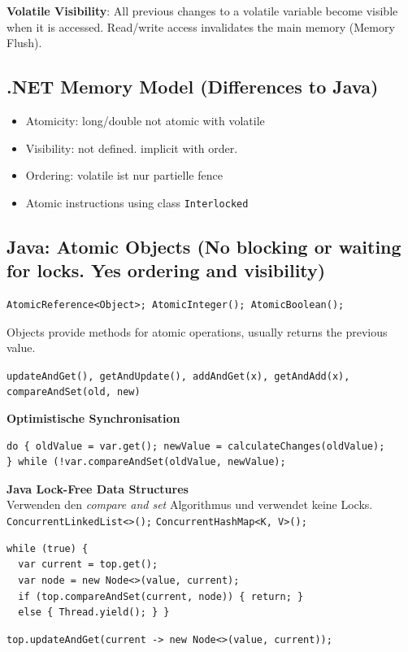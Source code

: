 \textbf{Volatile Visibility}: All previous changes to a volatile variable become visible when it is accessed. Read/write access invalidates the main memory (Memory Flush).

\subsection{.NET Memory Model (Differences to Java)}
\begin{itemize}
	\item Atomicity: long/double not atomic with volatile
	\item Visibility: not defined. implicit with order.
	\item Ordering: volatile ist nur partielle fence
	\item Atomic instructions using class \texttt{Interlocked}
\end{itemize}

\subsection{Java: Atomic Objects (No blocking or waiting for locks. Yes ordering and visibility)}

\begin{lstlisting}[style=java]
AtomicReference<Object>; AtomicInteger(); AtomicBoolean();
\end{lstlisting}
Objects provide methods for atomic operations, usually returns the previous value.
\vspace{-1mm}

\texttt{updateAndGet(), getAndUpdate(), addAndGet(x), getAndAdd(x), compareAndSet(old, new)}

\textbf{Optimistische Synchronisation}
\begin{lstlisting}[style=java]
do { oldValue = var.get(); newValue = calculateChanges(oldValue);
} while (!var.compareAndSet(oldValue, newValue);
\end{lstlisting}

\textbf{Java Lock-Free Data Structures} \\
Verwenden den \textit{compare and set} Algorithmus und verwendet keine Locks. \\
\texttt{ConcurrentLinkedList<>();}
\texttt{ConcurrentHashMap<K, V>();}

\begin{lstlisting}[style=java]
while (true) {
  var current = top.get();
  var node = new Node<>(value, current);
  if (top.compareAndSet(current, node)) { return; } 
  else { Thread.yield(); } }
\end{lstlisting}
\vspace{1mm}
\begin{lstlisting}[style=java]
top.updateAndGet(current -> new Node<>(value, current));
\end{lstlisting}

